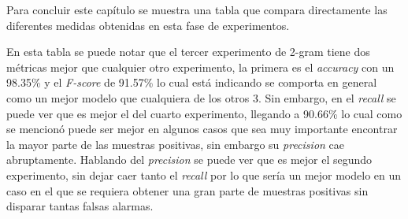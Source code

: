 \par Para concluir este capítulo se muestra una tabla que compara directamente las diferentes medidas obtenidas en esta fase de experimentos.

\begin{center}
	\begin{table}[H]
		\centering
		
		\label{tab:total}
	\end{table}
\end{center}

\par En esta tabla se puede notar que el tercer experimento de 2-gram tiene dos métricas mejor que cualquier otro experimento, la primera es el \textit{accuracy} con un 98.35\% y el \textit{F-score} de 91.57\% lo cual está indicando se comporta en general como un mejor modelo que cualquiera de los otros 3. Sin embargo, en el \textit{recall} se puede ver que es mejor el del cuarto experimento, llegando a 90.66\% lo cual como se mencionó puede ser mejor en algunos casos que sea muy importante encontrar la mayor parte de las muestras positivas, sin embargo su \textit{precision} cae abruptamente. Hablando del \textit{precision} se puede ver que es mejor el segundo experimento, sin dejar caer tanto el \textit{recall} por lo que sería un mejor modelo en un caso en el que se requiera obtener una gran parte de muestras positivas sin disparar tantas falsas alarmas.

